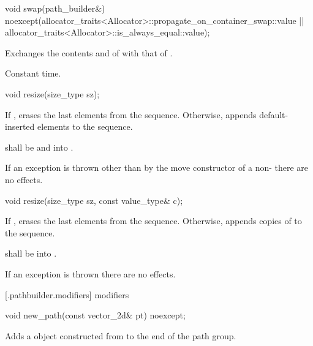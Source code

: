 %
\begin{itemdecl}
void swap(path_builder&)
  noexcept(allocator_traits<Allocator>::propagate_on_container_swap::value ||
  allocator_traits<Allocator>::is_always_equal::value);
\end{itemdecl}
\begin{itemdescr}
\pnum
\effects
Exchanges the contents and
of
with that of .

\pnum
\complexity
Constant time.
\end{itemdescr}

%
\begin{itemdecl}
void resize(size_type sz);
\end{itemdecl}
\begin{itemdescr}
\pnum
\effects
If , erases the last  elements
from the sequence. Otherwise, appends  default-inserted 
elements to the sequence.

\pnum
\requires
{} shall be
 and  into .

\pnum
\remarks
If an exception is thrown other than by the move constructor of a 
non-
 there are no effects.
\end{itemdescr}

%
\begin{itemdecl}
void resize(size_type sz, const value_type& c);
\end{itemdecl}
\begin{itemdescr}
\pnum
\effects
If , erases the last  elements
from the sequence. Otherwise,
appends  copies of  to the sequence.

\pnum
\requires
{} shall be  into .

\pnum
\remarks
If an exception is thrown there are no effects.
\end{itemdescr}

 [\iotwod.pathbuilder.modifiers] { modifiers}

%
\begin{itemdecl}
void new_path(const vector_2d& pt) noexcept;
\end{itemdecl}
\begin{itemdescr}
\pnum
\effects
Adds a  object constructed from  to the end of the path group.
\end{itemdescr}


